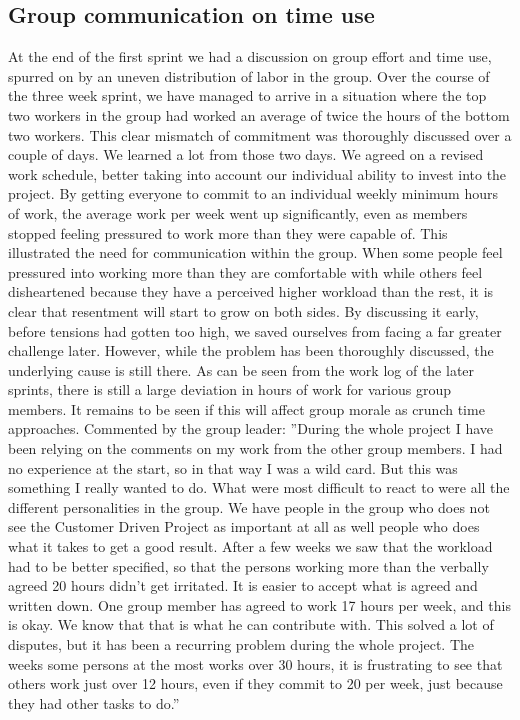 \subsection{Group communication on time use}
At the end of the first sprint we had a discussion on group effort and time use, spurred on by an uneven distribution of labor in the group. Over the course of the three week sprint, we have managed to arrive in a situation where the top two workers in the group had worked an average of twice the hours of the bottom two workers. This clear mismatch of commitment was thoroughly discussed over a couple of days.
\newline
\newline
We learned a lot from those two days. We agreed on a revised work schedule, better taking into account our individual ability to invest into the project. By getting everyone to commit to an individual weekly minimum hours of work, the average work per week went up significantly, even as members stopped feeling pressured to work more than they were capable of.
\newline
\newline
This illustrated the need for communication within the group. When some people feel pressured into working more than they are comfortable with while others feel disheartened because they have a perceived higher workload than the rest, it is clear that resentment will start to grow on both sides. By discussing it early, before tensions had gotten too high, we saved ourselves from facing a far greater challenge later.
\newline
\newline
However, while the problem has been thoroughly discussed, the underlying cause is still there. As can be seen from the work log of the later sprints, there is still a large deviation in hours of work for various group members. It remains to be seen if this will affect group morale as crunch time approaches.
\newline
\newline
Commented by the group leader: ''During the whole project I have been relying on the comments on my work from the other group members. I had no experience at the start, so in that way I was a wild card. But this was something I really wanted to do. What were most difficult to react to were all the different personalities in the group. We have people in the group who does not see the Customer Driven Project as important at all as well people who does what it takes to get a good result. After a few weeks we saw that the workload had to be better specified, so that the persons working more than the verbally agreed 20 hours didn’t get irritated. It is easier to accept what is agreed and written down. One group member has agreed to work 17 hours per week, and this is okay. We know that that is what he can contribute with.  This solved a lot of disputes, but it has been a recurring problem during the whole project. The weeks some persons at the most works over 30 hours, it is frustrating to see that others work just over 12 hours, even if they commit to 20 per week, just because they had other tasks to do.''

